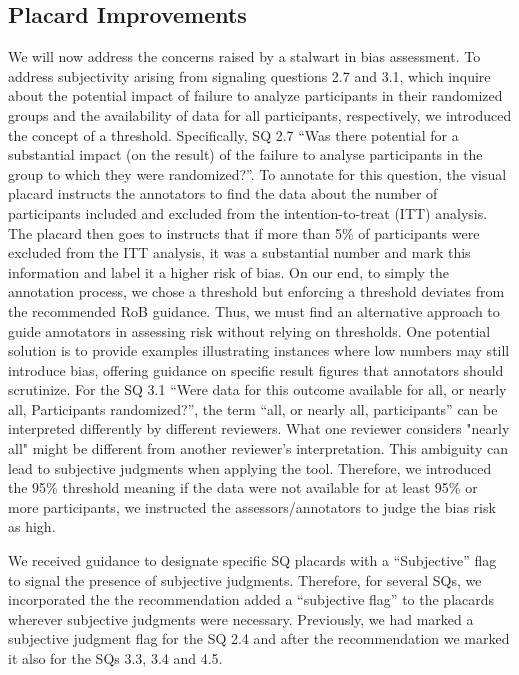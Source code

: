 \documentclass[sn-mathphys,Numbered]{sn-jnl}%
\theoremstyle{thmstyleone}%
\theoremstyle{thmstyletwo}%
\theoremstyle{thmstylethree}%
\begin{document}
\subsection{Placard Improvements}
\label{disc:improv}
%
We will now address the concerns raised by a stalwart in bias assessment.
To address subjectivity arising from signaling questions 2.7 and 3.1, which inquire about the potential impact of failure to analyze participants in their randomized groups and the availability of data for all participants, respectively, we introduced the concept of a threshold.
Specifically, SQ 2.7 ``Was there potential for a substantial impact (on the result) of the failure to analyse participants in the group to which they were randomized?''.
To annotate for this question, the visual placard instructs the annotators to find the data about the number of participants included and excluded from the intention-to-treat (ITT) analysis.
The placard then goes to instructs that if more than 5\% of participants were excluded from the ITT analysis, it was a substantial number and mark this information and label it a higher risk of bias.
On our end, to simply the annotation process, we chose a threshold but enforcing a threshold deviates from the recommended RoB guidance.
Thus, we must find an alternative approach to guide annotators in assessing risk without relying on thresholds.
One potential solution is to provide examples illustrating instances where low numbers may still introduce bias, offering guidance on specific result figures that annotators should scrutinize.
For the SQ 3.1 ``Were data for this outcome available for all, or nearly all, Participants randomized?'', the term ``all, or nearly all, participants'' can be interpreted differently by different reviewers.
What one reviewer considers "nearly all" might be different from another reviewer's interpretation.
This ambiguity can lead to subjective judgments when applying the tool.
Therefore, we introduced the 95\% threshold meaning if the data were not available for at least 95\% or more participants, we instructed the assessors/annotators to judge the bias risk as high.


We received guidance to designate specific SQ placards with a ``Subjective'' flag to signal the presence of subjective judgments.
Therefore, for several SQs, we incorporated the the recommendation added a ``subjective flag'' to the placards wherever subjective judgments were necessary.
Previously, we had marked a subjective judgment flag for the SQ 2.4 and after the recommendation we marked it also for the SQs 3.3, 3.4 and 4.5.
\end{document}

